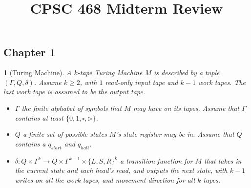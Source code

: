 \documentclass[10pt]{article}
\title{CPSC 468 Midterm Review}
\author{}
\date{}
\newtheorem{note}{}[section]
\begin{document}
\maketitle

\newcommand{\E}{\mathrm{E}}
\newcommand{\Var}{\mathrm{Var}}
\newcommand{\Real}{\mathrm{Re}}
\newcommand{\Imag}{\mathrm{Im}}
\newcommand{\res}{\mathrm{res}}
\newcommand{\NP}{\mathrm{NP}}
\newcommand{\NPC}{\mathrm{NP\mhyphen Complete}}
\newcommand{\coNP}{\mathrm{coNP}}
\newcommand{\coNPC}{\mathrm{coNP\mhyphen Complete}}
\newcommand{\DP}{\mathrm{DP}}
\newcommand{\PTIME}{\mathrm{P}}
\newcommand{\AL}{\mathrm{AL}}
\newcommand{\INDSET}{\mathrm{INDSET}}
\newcommand{\NOTINDSET}{\overline{\mathrm{INDSET}}}
\newcommand{\EXACTINDSET}{\mathrm{EXACT\mhyphen INDSET}}
\newcommand{\SAT}{\mathrm{SAT}}
\newcommand{\UNSAT}{\overline{\mathrm{SAT}}}
\newcommand{\ACCEPT}{\mathrm{ACCEPT}}
\newcommand{\REJECT}{\mathrm{REJECT}}
\newcommand{\DTIME}{\mathrm{DTIME}}
\newcommand{\EXP}{\mathrm{EXP}}

\newcommand{\st}{\mathrm{\ s.t.\ }}

\subsection*{Chapter 1}
\begin{note}[Turing Machine]
  A $k$-tape Turing Machine $M$ is described by a tuple $(\Gamma, Q, \delta)$.
  Assume $k \geq 2$, with $1$ read-only input tape and $k - 1$ work tapes.
  The last work tape is assumed to be the output tape.
  \begin{itemize}
    \item
      $\Gamma$ the finite alphabet of symbols that $M$ may have on its tapes.
      Assume that $\Gamma$ contains at least $\{0,1,\square,\triangleright\}$.

    \item
      $Q$ a finite set of possible states $M$'s state register may be in.
      Assume that $Q$ contains a $q_{start}$ and $q_{halt}$.

    \item
      $\delta : Q \times \Gamma^k \to Q
      \times \Gamma^{k - 1} \times \{L, S, R\}^k$ a transition function for
      $M$ that takes in the current state and each head's read, and outputs
      the next state, with $k - 1$ writes on all the work tapes, and movement
      direction for all $k$ tapes.
  \end{itemize}
\end{note}
\end{document}
